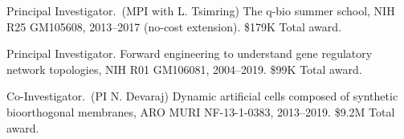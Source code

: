 \begin{enumerate}
\begin{item}
Principal Investigator.~(MPI with L. Tsimring) The q-bio summer school, NIH R25 GM105608, 2013--2017 (no-cost extension).
\$179K Total award.
\end{item}

\begin{item}
Principal Investigator. Forward engineering to understand gene regulatory network topologies, NIH R01 GM106081, 2004--2019.
\$99K Total award.
\end{item}

\begin{item}
Co-Investigator.~(PI N. Devaraj) Dynamic artificial cells composed of synthetic bioorthogonal membranes, ARO MURI NF-13-1-0383, 2013--2019.
\$9.2M Total award.
\end{item}


\end{enumerate}
